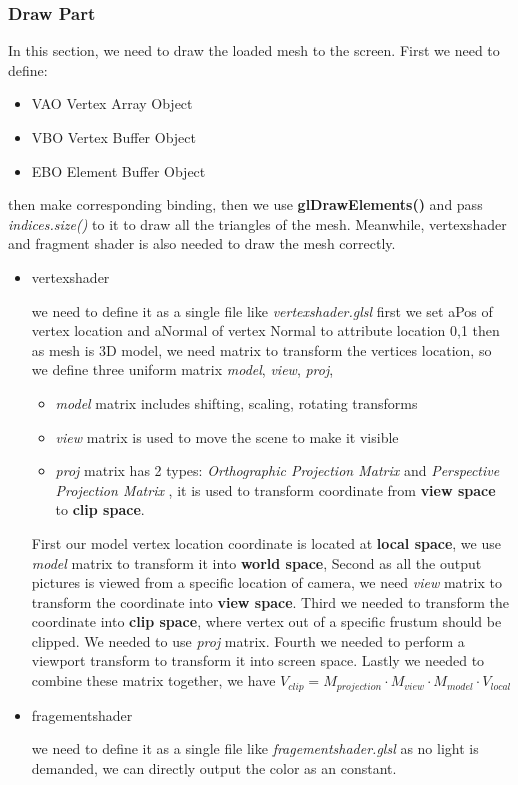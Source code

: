 \documentclass[acmtog]{acmart}
\begin{document}
\subsubsection{Draw Part}
	In this section, we need to draw the loaded mesh to the screen. First we need to define:
	\begin{itemize}
		\item VAO Vertex Array Object
		\item VBO Vertex Buffer Object
		\item EBO Element Buffer Object
	\end{itemize}
	then make corresponding binding, then we use \textbf{glDrawElements()} and pass \emph{indices.size()} to it
	to draw all the triangles of the mesh.
	Meanwhile, vertexshader and fragment shader is also needed to draw the mesh correctly. 
	\begin{itemize}
		\item vertexshader	\par we need to define it as a single file like \emph{vertexshader.glsl}
			first we set aPos of vertex location and aNormal of vertex Normal to attribute location 0,1
			then as mesh is 3D model, we need matrix to transform the vertices location, so we define three uniform matrix
			\emph{model}, \emph{view}, \emph{proj}, 
			\begin{itemize}
				\item \emph{model} matrix includes shifting, scaling, rotating transforms
				\item \emph{view} matrix is used to move the scene to make it visible
				\item \emph{proj} matrix has 2 types: \emph{Orthographic Projection Matrix} and \emph{Perspective Projection Matrix}
					, it is used to transform coordinate from \textbf{view space} to \textbf{clip space}.
			\end{itemize}
			First our model vertex location coordinate is located at \textbf{local space}, we use \emph{model} matrix to transform it
			into \textbf{world space}, 
			Second as all the output pictures is viewed from a specific location of camera, we need \emph{view} matrix to transform
			the coordinate into \textbf{view space}.
			Third we needed to transform the coordinate into \textbf{clip space}, where vertex out of a specific frustum
			should be clipped. We needed to use \emph{proj} matrix.
			Fourth we needed to perform a viewport transform to transform it into screen space. 
			Lastly we needed to combine these matrix together, we have \(V_{clip} = M_{projection} \cdot M_{view} \cdot M_{model} \cdot V_{local}\)

		\item fragementshader \par we need to define it as a single file like \emph{fragementshader.glsl}
			as no light is demanded, we can directly output the color as an constant.
	\end{itemize}
\end{document}
